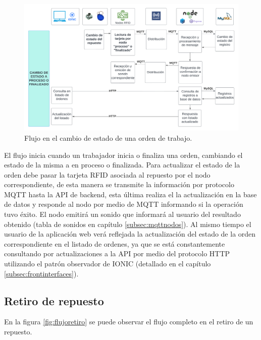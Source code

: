\begin{figure}[ht]
	\centering
	\includegraphics[width=\textwidth]{./Figures/flujo-cambio-estado.png}
	\caption{Flujo en el cambio de estado de una orden de trabajo.}
	\label{fig:flujocambioestado}
\end{figure}

El flujo inicia cuando un trabajador inicia o finaliza una orden, cambiando el estado de la misma a en proceso o finalizada. Para actualizar el estado de la orden debe pasar la tarjeta RFID asociada al repuesto por el nodo correspondiente, de esta manera se transmite la información por protocolo MQTT hasta la API de backend, esta última realiza el la actualización en la base de datos y responde al nodo por medio de MQTT informando si la operación tuvo éxito. El nodo emitirá un sonido que informará al usuario del resultado obtenido (tabla de sonidos en capítulo \ref{subsec:mqttnodos}). Al mismo tiempo el usuario de la aplicación web verá reflejada la actualización del estado de la orden correspondiente en el listado de ordenes, ya que se está constantemente consultando por actualizaciones a la API por medio del protocolo HTTP utilizando el patrón observador de IONIC (detallado en el capítulo \ref{subsec:frontinterfaces}).

\subsection{Retiro de repuesto}
\label{subsec:flujoretiro}

En la figura \ref{fig:flujoretiro} se puede observar el flujo completo en el retiro de un repuesto.

